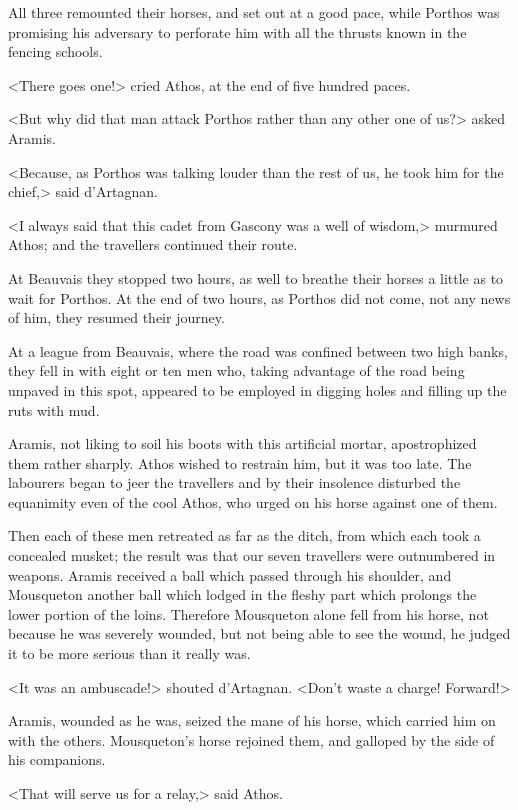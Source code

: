 All three remounted their horses, and set out at a good pace, while Porthos was promising his adversary to perforate him with all the thrusts known in the fencing schools. 

<There goes one!> cried Athos, at the end of five hundred paces. 

<But why did that man attack Porthos rather than any other one of us?> asked Aramis. 

<Because, as Porthos was talking louder than the rest of us, he took him for the chief,> said d'Artagnan. 

<I always said that this cadet from Gascony was a well of wisdom,> murmured Athos; and the travellers continued their route. 

At Beauvais they stopped two hours, as well to breathe their horses a little as to wait for Porthos. At the end of two hours, as Porthos did not come, not any news of him, they resumed their journey. 

At a league from Beauvais, where the road was confined between two high banks, they fell in with eight or ten men who, taking advantage of the road being unpaved in this spot, appeared to be employed in digging holes and filling up the ruts with mud. 

Aramis, not liking to soil his boots with this artificial mortar, apostrophized them rather sharply. Athos wished to restrain him, but it was too late. The labourers began to jeer the travellers and by their insolence disturbed the equanimity even of the cool Athos, who urged on his horse against one of them. 

Then each of these men retreated as far as the ditch, from which each took a concealed musket; the result was that our seven travellers were outnumbered in weapons. Aramis received a ball which passed through his shoulder, and Mousqueton another ball which lodged in the fleshy part which prolongs the lower portion of the loins. Therefore Mousqueton alone fell from his horse, not because he was severely wounded, but not being able to see the wound, he judged it to be more serious than it really was. 

<It was an ambuscade!> shouted d'Artagnan. <Don't waste a charge! Forward!> 

Aramis, wounded as he was, seized the mane of his horse, which carried him on with the others. Mousqueton's horse rejoined them, and galloped by the side of his companions. 

<That will serve us for a relay,> said Athos. 

